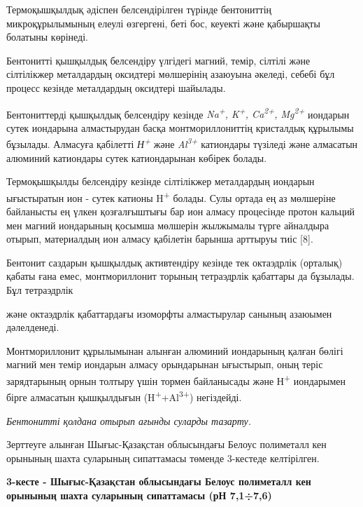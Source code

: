 Термоқышқылдық әдіспен белсендірілген түрінде бентониттің
микроқұрылымының елеулі өзгергені, беті бос, кеуекті және қабыршақты
болатыны көрінеді.

Бентонитті қышқылдық белсендіру үлгідегі магний, темір, сілтілі және
сілтілікжер металдардың оксидтері мөлшерінің азаюуына әкеледі, себебі
бұл процесс кезінде металдардың оксидтері шайылады.

Бентониттерді қышқылдық белсендіру кезінде \emph{Na\textsuperscript{+},
K\textsuperscript{+}, Ca\textsuperscript{2+}, Mg\textsuperscript{2+}}
иондарын сутек иондарына алмастырудан басқа монтмориллониттің кристалдық
құрылымы бұзылады. Алмасуға қабілетті \emph{Н\textsuperscript{+}} және
\emph{Al\textsuperscript{3+ }}катиондары түзіледі және алмасатын
алюминий катиондары сутек катиондарынан көбірек болады.

Термоқышқылды белсендіру кезінде сілтілікжер металдардың иондарын
ығыстыратын ион - сутек катионы H\textsuperscript{+} болады. Сулы ортада
ең аз мөлшеріне байланысты ең үлкен қозғалғыштығы бар ион алмасу
процесінде протон кальций мен магний иондарының қосымша мөлшерін
жылжымалы түрге айналдыра отырып, материалдың ион алмасу қабілетін
барынша арттыруы тиіс {[}8{]}.

Бентонит саздарын қышқылдық активтендіру кезінде тек октаэдрлік
(орталық) қабаты ғана емес, монтмориллонит торының тетраэдрлік қабаттары
да бұзылады. Бұл тетраэдрлік

және октаэдрлік қабаттардағы изоморфты алмастырулар санының азаюымен
дәлелденеді.

Монтмориллонит құрылымынан алынған алюминий иондарының қалған бөлігі
магний мен темір иондарын алмасу орындарынан ығыстырып, оның теріс
зарядтарының орнын толтыру үшін тормен байланысады және
Н\textsuperscript{+} иондарымен бірге алмасатын қышқылдығын
(H\textsuperscript{+}+Al\textsuperscript{3+}) негіздейді.

\emph{Бентонитті қолдана отырып ағынды суларды тазарту.}

Зерттеуге алынған Шығыс-Қазақстан облысындағы Белоус полиметалл кен
орынының шахта суларының сипаттамасы төменде 3-кестеде келтірілген.

{\bfseries 3-кесте - Шығыс-Қазақстан облысындағы Белоус полиметалл кен
орынының шахта суларының сипаттамасы (рН 7,1÷7,6)}

